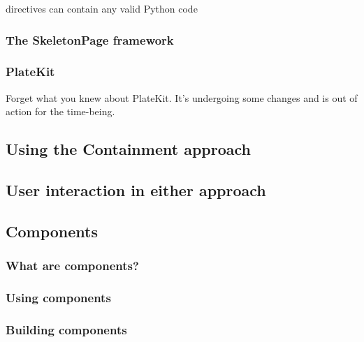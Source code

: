  directives can contain any valid Python code

\subsubsection{The SkeletonPage framework}

\subsubsection{PlateKit}
Forget what you knew about PlateKit. It's undergoing some changes and is out of
action for the time-being.

\subsection{Using the Containment approach}


\subsection{User interaction in either approach}


\subsection{Components}

\subsubsection{What are components?}

\subsubsection{Using components}

\subsubsection{Building components}


